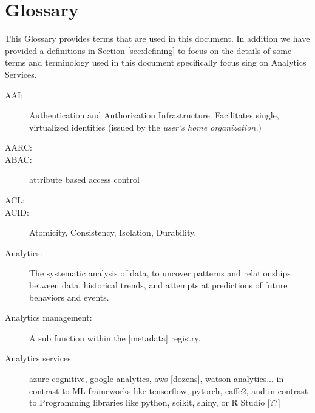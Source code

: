 
\section{Glossary}
\label{sec:glossary}


This Glossary provides terms that are used in this document. In
addition we have provided a definitions in Section \ref{sec:defining}
to focus on the details of some terms and terminology used in this
document specifically focus sing on Analytics Services.

\begin{description}

  
\item[AAI:] Authentication and Authorization
  Infrastructure. Facilitates single, virtualized identities (issued
  by the {\em user's home organization.})

\item[AARC:]     

\item[ABAC:] attribute based access control

\item[ACL:] 

\item[ACID:] Atomicity, Consistency, Isolation, Durability.

\item[Analytics:] The systematic analysis of data, to uncover patterns
  and relationships between data, historical trends, and attempts at
  predictions of future behaviors and events.

\item[Analytics management:] A sub function within the [metadata]
  registry.

\item[Analytics services] azure cognitive, google analytics, aws
  [dozens], watson analytics... in contrast to ML frameworks like
  tensorflow, pytorch, caffe2, and in contrast to Programming
  libraries like python, scikit, shiny, or R Studio [??]



\end{description}
